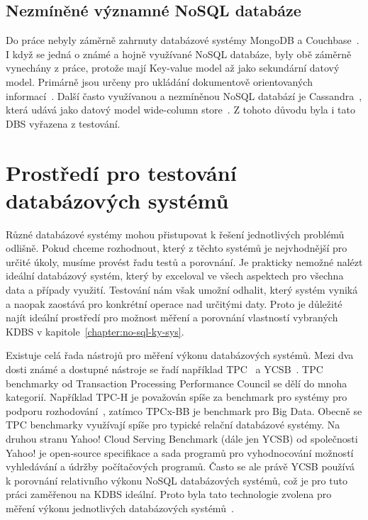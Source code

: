 \documentclass[czech,master,dept460,male,csharp,cpdeclaration]{diploma}
\begin{document}
	\section {Nezmíněné významné NoSQL databáze}
	
		Do práce nebyly záměrně zahrnuty databázové systémy MongoDB a Couchbase~\cite{mongodb,couchbase}. I když se jedná o známé a hojně využívané NoSQL databáze, byly obě záměrně vynechány z práce, protože mají Key-value model až jako sekundární datový model. Primárně jsou určeny pro ukládání dokumentově orientovaných informací~\cite{documentdb}. Další často využívanou a nezmíněnou NoSQL databází je Cassandra~\cite{cassandra}, která udává jako datový model wide-column store~\cite{widecolumnstore}. Z tohoto důvodu byla i tato DBS vyřazena z testování.
	
	\chapter{Prostředí pro testování databázových systémů\label{chapter:3-test_environment}}
	
	Různé databázové systémy mohou přistupovat k řešení jednotlivých problémů odlišně. Pokud chceme rozhodnout, který z těchto systémů je nejvhodnější pro určité úkoly, musíme provést řadu testů a porovnání. Je prakticky nemožné nalézt ideální databázový systém, který by exceloval ve všech aspektech pro všechna data a případy využití. Testování nám však umožní odhalit, který systém vyniká a naopak zaostává pro konkrétní operace nad určitými daty. Proto je důležité najít ideální prostředí pro možnost měření a porovnání vlastností vybraných KDBS v kapitole~\ref{chapter:no-sql-ky-sys}.
	
	Existuje celá řada nástrojů pro měření výkonu databázových systémů. Mezi dva dosti známé a dostupné nástroje se řadí například TPC~\cite{tpc} a YCSB~\cite{ycsb}. TPC benchmarky od Transaction Processing Performance Council se dělí do mnoha kategorií. Například TPC-H je považován spíše za benchmark pro systémy pro podporu rozhodování~\cite{dss}, zatímco TPCx-BB je benchmark pro Big Data. Obecně se TPC benchmarky využívají spíše pro typické relační databázové systémy. Na druhou stranu Yahoo! Cloud Serving Benchmark (dále jen YCSB) od společnosti Yahoo! je open-source specifikace a sada programů pro vyhodnocování možností vyhledávání a údržby počítačových programů. Často se ale právě YCSB používá k porovnání relativního výkonu NoSQL databázových systémů, což je pro tuto práci zaměřenou na KDBS ideální. Proto byla tato technologie zvolena pro měření výkonu jednotlivých databázových systémů~\cite{benchmark-pdf-1, benchmark-pdf-2}.
	
\end{document}

